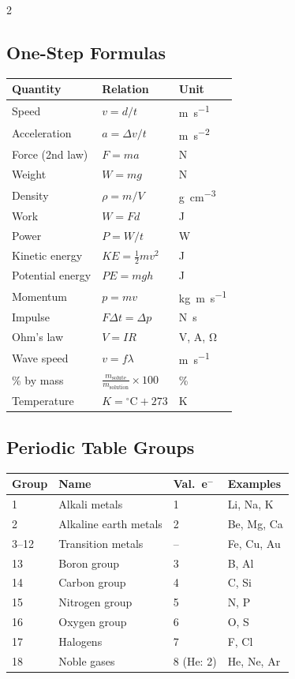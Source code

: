 \begin{multicols}{2}
\subsection*{One-Step Formulas}
\begin{tabular}{@{}p{2.6cm}p{2.4cm}p{2.4cm}@{}}
\toprule
Quantity & Relation & Unit\\ \midrule
Speed & $v = d/t$ & \si{\meter\per\second}\\
Acceleration & $a = \Delta v/t$ & \si{\meter\per\second\squared}\\
Force (2nd law) & $F = ma$ & N\\
Weight & $W = mg$ & N\\
Density & $\rho = m/V$ & \si{\gram\per\cubic\centi\meter}\\
Work & $W = Fd$ & J\\
Power & $P = W/t$ & W\\
Kinetic energy & $KE = \frac{1}{2}mv^2$ & J\\
Potential energy & $PE = mgh$ & J\\
Momentum & $p = mv$ & \si{\kilogram\meter\per\second}\\
Impulse & $F\Delta t = \Delta p$ & \si{\newton\second}\\
Ohm's law & $V = IR$ & V, A, \si{\ohm}\\
Wave speed & $v = f\lambda$ & \si{\meter\per\second}\\
\% by mass & $\frac{m_\text{solute}}{m_\text{solution}}\times 100$ & \%\\
Temperature & $K = {}^\circ\text{C} + 273$ & K\\ \bottomrule
\end{tabular}

\subsection*{Periodic Table Groups}
\begin{tabular}{@{}p{1.2cm}p{2.8cm}p{1.2cm}p{2.2cm}@{}}
\toprule
Group & Name & Val.\ e$^-$ & Examples\\ \midrule
1 & Alkali metals & 1 & Li, Na, K\\
2 & Alkaline earth metals & 2 & Be, Mg, Ca\\
3--12 & Transition metals & -- & Fe, Cu, Au\\
13 & Boron group & 3 & B, Al\\
14 & Carbon group & 4 & C, Si\\
15 & Nitrogen group & 5 & N, P\\
16 & Oxygen group & 6 & O, S\\
17 & Halogens & 7 & F, Cl\\
18 & Noble gases & 8 (He: 2) & He, Ne, Ar\\ \bottomrule
\end{tabular}


\end{multicols}
